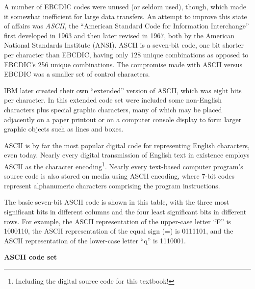 A number of EBCDIC codes were unused (or seldom used), though, which made it somewhat inefficient for large data transfers.  An attempt to improve this state of affairs was \textit{ASCII}, the ``American Standard Code for Information Interchange'' first developed in 1963 and then later revised in 1967, both by the American National Standards Institute (ANSI).  ASCII is a seven-bit code, one bit shorter per character than EBCDIC, having only 128 unique combinations as opposed to EBCDIC's 256 unique combinations.  The compromise made with ASCII versus EBCDIC was a smaller set of control characters.  

IBM later created their own ``extended'' version of ASCII, which was eight bits per character.  In this extended code set were included some non-English characters plus special graphic characters, many of which may be placed adjacently on a paper printout or on a computer console display to form larger graphic objects such as lines and boxes.

\vskip 10pt

ASCII is by far the most popular digital code for representing English characters, even today.  Nearly every digital transmission of English text in existence employs ASCII as the character encoding\footnote{Including the digital source code for this textbook!}.  Nearly every text-based computer program's source code is also stored on media using ASCII encoding, where 7-bit codes represent alphanumeric characters comprising the program instructions.

\filbreak

The basic seven-bit ASCII code is shown in this table, with the three most significant bits in different columns and the four least significant bits in different rows.  For example, the ASCII representation of the upper-case letter ``F'' is 1000110, the ASCII representation of the equal sign (=) is 0111101, and the ASCII representation of the lower-case letter ``q'' is 1110001.

\vskip 10pt

\textbf{ASCII code set}


